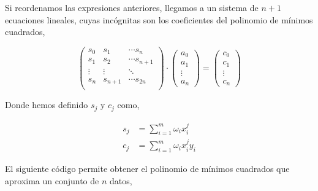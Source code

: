 Si reordenamos las expresiones anteriores, llegamos a un sistema de $n+1$ ecuaciones lineales, cuyas incógnitas son los coeficientes del polinomio de mínimos cuadrados,

\begin{equation*}
\begin{pmatrix}
s_0& s_1& \cdots s_n\\
s_1& s_2& \cdots s_{n+1}\\
\vdots & \vdots & \ddots \\
s_n& s_{n+1}& \cdots s_{2n}\\
\end{pmatrix}\cdot \begin{pmatrix}
a_0\\
a_1\\
\vdots \\
a_n
\end{pmatrix}=\begin{pmatrix}
c_0\\
c_1\\
\vdots \\
c_n
\end{pmatrix}
\end{equation*} 

Donde hemos definido $s_j$ y $c_j$ como,

\begin{align*}
s_j&=\sum_{i=1}^m \omega_ix_i^j\\
c_j&=\sum_{i=1}^m \omega_ix_i^jy_i
\end{align*}
 
El siguiente código permite obtener el polinomio de mínimos cuadrados que aproxima un conjunto de $n$ datos,

